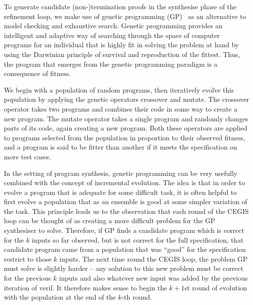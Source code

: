 \documentclass[preprint]{sigplanconf}
\theoremstyle{definition}
\begin{document}
 \label{sec:gp}
To generate candidate (non-)termination proofs in the synthesise phase of
the refinement loop, we make use of genetic programming
(GP)~\cite{langdon:fogp} as an alternative to model checking and exhaustive
search.  Genetic programming provides an intelligent and adaptive way of
searching through the space of computer programs for an individual that is
highly fit in solving the problem at hand by using the Darwinian principle
of survival and reproduction of the fittest.  Thus, the program that emerges
from the genetic programming paradigm is a consequence of fitness.

We begin with a population of random programs, then iteratively evolve this
population by applying the genetic operators {\sc crossover} and {\sc
mutate}.  The {\sc crossover} operator takes two programs and combines their
code in some way to create a new program.  The {\sc mutate} operator takes a
single program and randomly changes parts of its code, again creating a new
program.  Both these operators are applied to programs selected from the
population in proportion to their observed fitness, and a program is said to
be fitter than another if it meets the specification on more test cases.

In the setting of program synthesis, genetic programming can be very
usefully combined with the concept of incremental evolution.  The idea is
that in order to evolve a program that is adequate for some difficult task,
it is often helpful to first evolve a population that as an ensemble is good
at some simpler variation of the task.  This principle leads us to the
observation that each round of the CEGIS loop can be thought of as creating
a more difficult problem for the GP synthesiser to solve.  Therefore, if GP
finds a candidate program which is correct for the $k$ inputs so far
observed, but is not correct for the full specification, that candidate
program came from a population that was ``good'' for the specification
restrict to those $k$ inputs.  The next time round the CEGIS loop, the
problem GP must solve is slightly harder -- any solution to this new problem
must be correct for the previous $k$ inputs and also whatever new input was
added by the previous iteration of {\sc verif}.  It therefore makes sense to
begin the $k+1$st round of evolution with the population at the end of the
$k$-th round.
\end{document}
